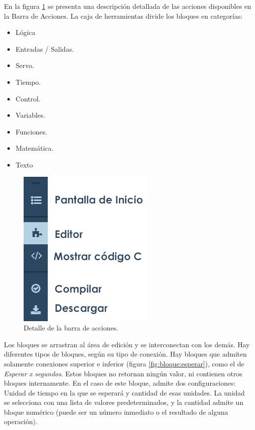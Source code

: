 En la figura \ref{fig:barra-acciones} se presenta una descripción detallada de las acciones disponibles en la Barra de Acciones. La caja de herramientas divide los bloques en categorías:

\begin{itemize}
\item Lógica
\item Entradas / Salidas.
\item Servo.
\item Tiempo.
\item Control.
\item Variables.
\item Funciones.
\item Matemática.
\item Texto
\end{itemize}

\begin{figure}[h]
\centering
\includegraphics[scale=.8]{./Figures/barra-acciones.jpg}
\caption{Detalle de la barra de acciones.}
\label{fig:barra-acciones}
\end{figure}

Los bloques se arrastran al área de edición y se interconectan con los demás. Hay diferentes tipos de bloques, según su tipo de conexión. Hay bloques que admiten solamente conexiones superior e inferior (figura \ref{fig:bloque:esperar}), como el de \emph{Esperar x segundos}. Estos bloques no retornan ningún valor, ni contienen otros bloques internamente. En el caso de este bloque, admite dos configuraciones: Unidad de tiempo en la que se esperará y cantidad de esas unidades. La unidad se selecciona con una lista de valores predeterminados, y la cantidad admite un bloque numérico (puede ser un número inmediato o el resultado de alguna operación).


